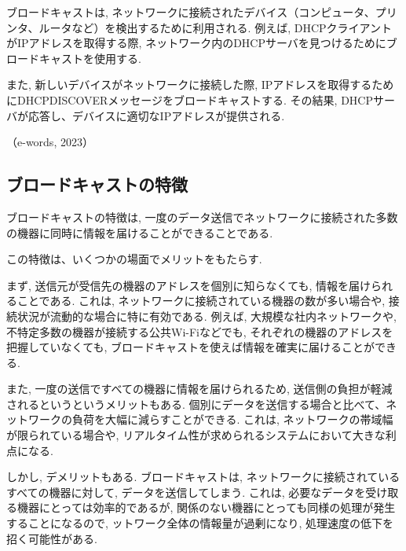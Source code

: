 \documentclass{ltjsarticle} %
\begin{document}
\vspace{0.5cm}

ブロードキャストは, ネットワークに接続されたデバイス（コンピュータ、プリンタ、ルータなど）を検出するために利用される. 
例えば,  DHCPクライアントがIPアドレスを取得する際, ネットワーク内のDHCPサーバを見つけるためにブロードキャストを使用する. 

\vspace{0.5cm}

また, 新しいデバイスがネットワークに接続した際, IPアドレスを取得するためにDHCPDISCOVERメッセージをブロードキャストする. 
その結果, DHCPサーバが応答し、デバイスに適切なIPアドレスが提供される. 

（e-words, 2023）

\subsection{ブロードキャストの特徴}
ブロードキャストの特徴は, 一度のデータ送信でネットワークに接続された多数の機器に同時に情報を届けることができることである. 

\vspace{0.5cm}

この特徴は、いくつかの場面でメリットをもたらす. 

まず, 送信元が受信先の機器のアドレスを個別に知らなくても, 情報を届けられることである. 
これは, ネットワークに接続されている機器の数が多い場合や, 接続状況が流動的な場合に特に有効である. 
例えば, 大規模な社内ネットワークや, 不特定多数の機器が接続する公共Wi-Fiなどでも, それぞれの機器のアドレスを把握していなくても, 
ブロードキャストを使えば情報を確実に届けることができる. 

\vspace{0.5cm}

また, 一度の送信ですべての機器に情報を届けられるため, 送信側の負担が軽減されるというというメリットもある. 
個別にデータを送信する場合と比べて、ネットワークの負荷を大幅に減らすことができる. 
これは, ネットワークの帯域幅が限られている場合や, リアルタイム性が求められるシステムにおいて大きな利点になる. 

\vspace{0.5cm}

しかし, デメリットもある. 
ブロードキャストは, ネットワークに接続されているすべての機器に対して, データを送信してしまう.  
これは, 必要なデータを受け取る機器にとっては効率的であるが, 関係のない機器にとっても同様の処理が発生することになるので, 
ットワーク全体の情報量が過剰になり, 処理速度の低下を招く可能性がある. 
\end{document}
